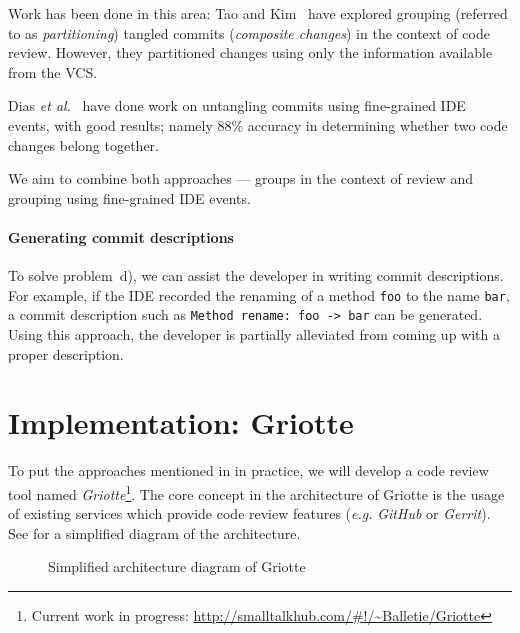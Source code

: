 \documentclass[conference,a4paper]{IEEEtran}
\newcommand{\code}[1]{\texttt{#1}}
\begin{document}
Work has been done in this area: Tao and Kim~\cite{Tao15a} have
explored grouping (referred to as \textit{partitioning}) tangled
commits (\textit{composite changes}) in the context of code
review. However, they partitioned changes using only the information
available from the VCS.

Dias \textit{et al.}~\cite{Dias15a} have done work on untangling
commits using fine-grained IDE events, with good results; namely 88\%
accuracy in determining whether two code changes belong together.

We aim to combine both approaches --- groups in the context of review
and grouping using fine-grained IDE events.

\paragraph{Generating commit descriptions}

To solve problem~d), we can assist the developer in writing commit
descriptions. For example, if the IDE recorded the renaming of a
method \code{foo} to the name \code{bar}, a commit description such as
\code{Method rename: foo -> bar} can be generated. Using this
approach, the developer is partially alleviated from coming up with a
proper description.

\section{Implementation: Griotte}
\label{sec:impl-griotte}

To put the approaches mentioned in  in
practice, we will develop a code review tool named
\textit{Griotte}\footnote{Current work in progress:
  \url{http://smalltalkhub.com/\#!/~Balletie/Griotte}}. The core
concept in the architecture of Griotte is the usage of existing
services which provide code review features (\textit{e.g.}
\textit{GitHub} or \textit{Gerrit}). See  for a
simplified diagram of the architecture.
\begin{figure}[t]
  \caption{Simplified architecture diagram of Griotte}
  \label{fig:diagram}
\end{figure}
\end{document}
